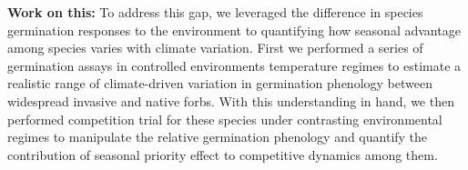 \documentclass{article}\usepackage[]{graphicx}\usepackage[]{color}
\begin{document}
\textbf{Work on this:} To address this gap, we leveraged the difference in species germination responses to the environment to quantifying how seasonal advantage among species varies with climate variation. First we performed a series of germination assays in controlled environments temperature regimes to estimate a realistic range of climate-driven variation in germination phenology between widespread invasive and native forbs. With this understanding in hand, we then performed competition trial for these species under contrasting environmental regimes to manipulate the relative germination phenology and quantify the contribution of seasonal priority effect to competitive dynamics among them.
\end{document}
